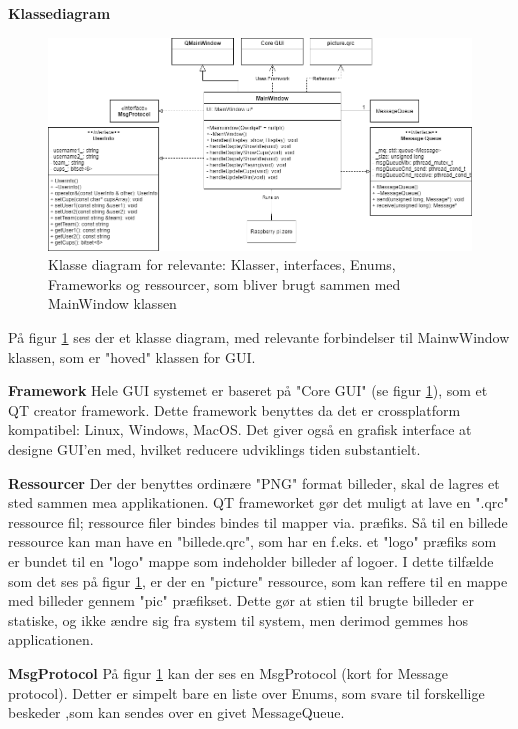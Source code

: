 \documentclass[Softwaredesign/Softwaredesign_main.tex]{subfiles}
\begin{document}
\textbf{Klassediagram}
\begin{figure}
    \centering
    \includegraphics[scale=0.4]{Softwaredesign/GUI/Pictures/Guiklassediagram.png}
    \caption{Klasse diagram for relevante: Klasser, interfaces, Enums, Frameworks og ressourcer, som bliver brugt sammen med MainWindow klassen}
    \label{fig:Gui_klassediagram}
\end{figure}

På figur \ref{fig:Gui_klassediagram} ses der et klasse diagram, med relevante forbindelser til MainwWindow klassen, som er "hoved" klassen for GUI. 

\textbf{Framework}
Hele GUI systemet er baseret på "Core GUI" (se figur \ref{fig:Gui_klassediagram}), som et QT creator framework. Dette framework benyttes da det er crossplatform kompatibel: Linux, Windows, MacOS. Det giver også en grafisk interface at designe GUI'en med, hvilket reducere udviklings tiden substantielt. 

\textbf{Ressourcer}
Der der benyttes ordinære "PNG" format billeder, skal de lagres et sted sammen mea applikationen. QT frameworket gør det muligt at lave en ".qrc" ressource fil; ressource filer bindes bindes til mapper via. præfiks. Så til en billede ressource kan man have en "billede.qrc", som har en f.eks. et "logo" præfiks som er bundet til en "logo" mappe som indeholder billeder af logoer. I dette tilfælde som det ses på figur \ref{fig:Gui_klassediagram}, er der en "picture" ressource, som kan reffere til en mappe med billeder gennem "pic" præfikset. Dette gør at stien til brugte billeder er statiske, og ikke ændre sig fra system til system, men derimod gemmes hos applicationen.

\textbf{MsgProtocol}
På figur \ref{fig:Gui_klassediagram} kan der ses en MsgProtocol (kort for Message protocol). Detter er simpelt bare en liste over Enums, som svare til forskellige beskeder ,som kan sendes over en givet MessageQueue. 
\end{document}
